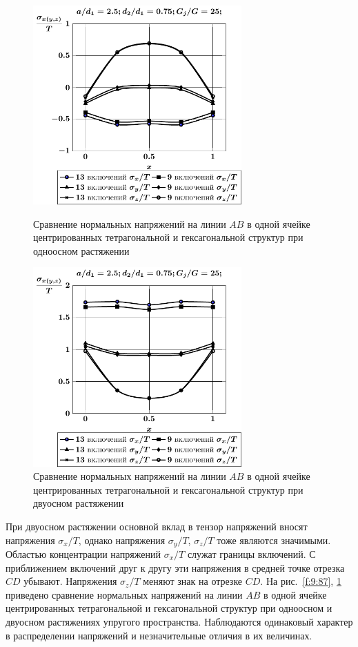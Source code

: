 \begin{figure}[h!]
\centering\footnotesize
\parbox[b]{7.5cm}{\centering\includegraphics[width=8cm]{inc13-9-a25-d75-g25-t1.pdf}
\caption{Сравнение нормальных напряжений на линии $AB$ в одной ячейке центрированных тетрагональной и гексагональной структур при одноосном растяжении
\label{f:9:87}}}\hfil\hfil
\parbox[b]{7.5cm}{\centering\includegraphics[width=8cm]{inc13-9-a25-d75-g25-t2.pdf}
\caption{Сравнение нормальных напряжений на линии $AB$ в одной ячейке центрированных тетрагональной и гексагональной структур при двуосном растяжении
\label{f:9:88}}}
\end{figure}

При двуосном растяжении основной вклад в тензор напряжений вносят напряжения $\sigma_x/T$, однако напряжения $\sigma_y/T$, $\sigma_z/T$ тоже являются значимыми. Областью концентрации напряжений $\sigma_x/T$ служат границы включений. С приближением включений друг к другу эти напряжения в средней точке отрезка $CD$ убывают. Напряжения $\sigma_z/T$ меняют знак на отрезке $CD$.
На рис.~\ref{f:9:87}, \ref{f:9:88} приведено сравнение нормальных напряжений на линии $AB$ в одной ячейке центрированных тетрагональной и гексагональной структур при одноосном и двуосном растяжениях упругого пространства. Наблюдаются одинаковый характер в распределении напряжений и незначительные отличия в их величинах.